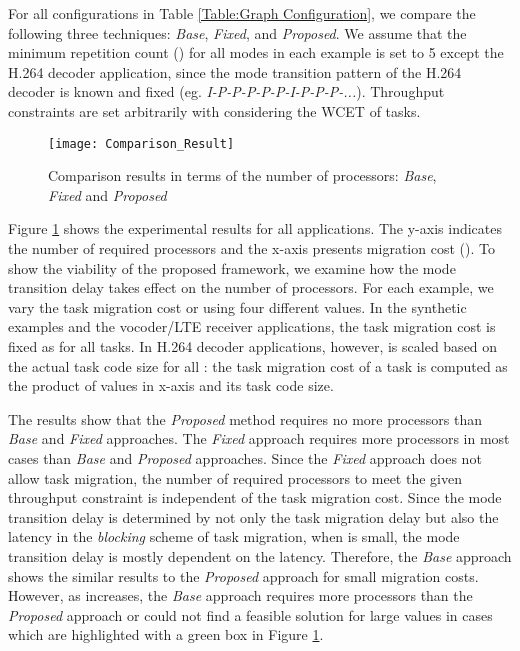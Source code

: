 \documentclass[prodmode,acmtecs]{acmsmall}
\begin{document}
For all configurations in Table \ref{Table:Graph Configuration}, we compare the following three techniques: \textit{Base}, \textit{Fixed}, and \textit{Proposed}. We assume that the minimum repetition count () for all modes in each example is set to 5 except the H.264 decoder application, since the mode transition pattern of the H.264 decoder is known and fixed (eg. \textit{I-P-P-P-P-P-I-P-P-P-...}). Throughput constraints are set arbitrarily with considering the WCET of tasks.

\begin{figure} [ht]
\centerline{\texttt{[image: Comparison\_Result]}}
\caption{Comparison results in terms of the number of processors: \textit{Base}, \textit{Fixed} and \textit{Proposed}}
\label{Figure:Comparison Result}
\end{figure}

Figure \ref{Figure:Comparison Result} shows the experimental results for all applications. The y-axis indicates the number of required processors and the x-axis presents migration cost (). To show the viability of the proposed framework, we examine how the mode transition delay takes effect on the number of processors. For each example, we vary the task migration cost or  using four different values. In the synthetic examples and the vocoder/LTE receiver applications, the task migration cost is fixed as  for all tasks. In H.264 decoder applications, however,  is scaled based on the actual task code size for all : the task migration cost of a task is computed as the product of  values in x-axis and its task code size.

The results show that the \textit{Proposed} method requires no more processors than \textit{Base} and \textit{Fixed} approaches. The \textit{Fixed} approach requires more processors in most cases than \textit{Base} and \textit{Proposed} approaches. Since the \textit{Fixed} approach does not allow task migration, the number of required processors to meet the given throughput constraint is independent of the task migration cost. Since the mode transition delay is determined by not only the task migration delay but also the latency in the \textit{blocking} scheme of task migration, when  is small, the mode transition delay is mostly dependent on the latency. Therefore, the \textit{Base} approach shows the similar results to the \textit{Proposed} approach for small migration costs. However, as  increases, the \textit{Base} approach requires more processors than the \textit{Proposed} approach or could not find a feasible solution for large  values in cases which are highlighted with a green box in Figure \ref{Figure:Comparison Result}.
\end{document}
